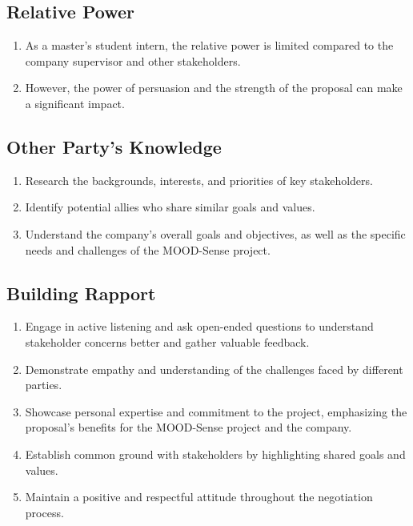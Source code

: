 \subsection*{Relative Power}

\begin{enumerate}
    \item As a master's student intern, the relative power is limited compared to the company supervisor and other stakeholders.
    \item However, the power of persuasion and the strength of the proposal can make a significant impact.
\end{enumerate}

\subsection*{Other Party's Knowledge}

\begin{enumerate}
   \item Research the backgrounds, interests, and priorities of key stakeholders.
   \item Identify potential allies who share similar goals and values.
   \item Understand the company's overall goals and objectives, as well as the specific needs and challenges of the MOOD-Sense project.
\end{enumerate}

\subsection*{Building Rapport}

\begin{enumerate}
    \item Engage in active listening and ask open-ended questions to understand stakeholder concerns better and gather valuable feedback.
    \item Demonstrate empathy and understanding of the challenges faced by different parties.
    \item Showcase personal expertise and commitment to the project, emphasizing the proposal's benefits for the MOOD-Sense project and the company.
    \item Establish common ground with stakeholders by highlighting shared goals and values.
    \item Maintain a positive and respectful attitude throughout the negotiation process.
\end{enumerate}

